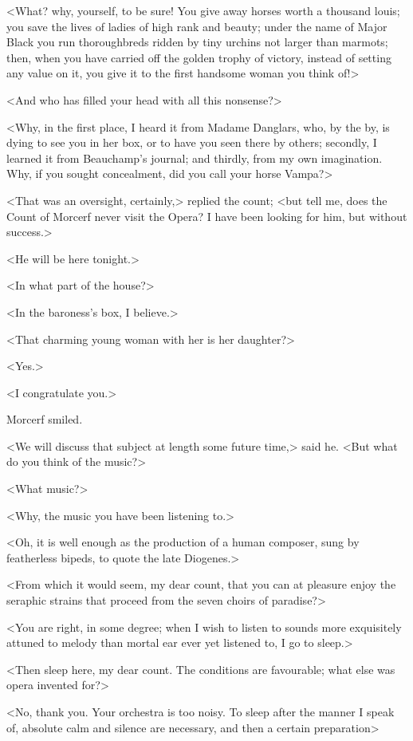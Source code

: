  <What? why, yourself, to be sure! You give away horses worth a thousand louis; you save the lives of ladies of high rank and beauty; under the name of Major Black you run thoroughbreds ridden by tiny urchins not larger than marmots; then, when you have carried off the golden trophy of victory, instead of setting any value on it, you give it to the first handsome woman you think of!> 

 <And who has filled your head with all this nonsense?> 

 <Why, in the first place, I heard it from Madame Danglars, who, by the by, is dying to see you in her box, or to have you seen there by others; secondly, I learned it from Beauchamp's journal; and thirdly, from my own imagination. Why, if you sought concealment, did you call your horse Vampa?> 

 <That was an oversight, certainly,> replied the count; <but tell me, does the Count of Morcerf never visit the Opera? I have been looking for him, but without success.> 

 <He will be here tonight.> 

 <In what part of the house?> 

 <In the baroness's box, I believe.> 

 <That charming young woman with her is her daughter?> 

 <Yes.> 

 <I congratulate you.> 

 Morcerf smiled. 

 <We will discuss that subject at length some future time,> said he. <But what do you think of the music?> 

 <What music?> 

 <Why, the music you have been listening to.> 

 <Oh, it is well enough as the production of a human composer, sung by featherless bipeds, to quote the late Diogenes.> 

 <From which it would seem, my dear count, that you can at pleasure enjoy the seraphic strains that proceed from the seven choirs of paradise?>

<You are right, in some degree; when I wish to listen to sounds more exquisitely attuned to melody than mortal ear ever yet listened to, I go to sleep.> 

 <Then sleep here, my dear count. The conditions are favourable; what else was opera invented for?> 

 <No, thank you. Your orchestra is too noisy. To sleep after the manner I speak of, absolute calm and silence are necessary, and then a certain preparation\longdash> 

